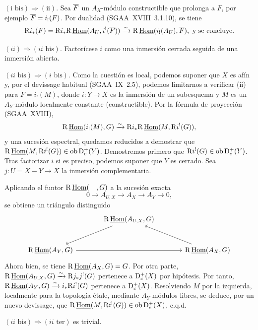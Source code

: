 $(\text{i~bis}) \Rightarrow (\text{ii})$. Sea $\overline{F}$ un $A_X$-módulo constructible que prolonga a $F$, por ejemplo $\overline{F} = i_{!}(F)$. Por dualidad (SGAA~XVIII~3.1.10), se tiene
\[
\mathrm{R} i_{*}(F) = \mathrm{R} i_{*} \mathrm{R}\,\underline{\operatorname{Hom}}(A_U, i^{!}(\overline{F})) \xrightarrow{\sim} \mathrm{R}\,\underline{\operatorname{Hom}}(i_{!}(A_U), \overline{F}), \text{ y se concluye.}
\]

$(ii) \Rightarrow (ii\text{~bis})$. Factorícese $i$ como una inmersión cerrada seguida de una inmersión abierta.

$(ii\text{~bis}) \Rightarrow (i\text{~bis})$. Como la cuestión es local, podemos suponer que $X$ es afín y, por el devissage habitual (SGAA~IX~2.5), podemos limitarnos a verificar (ii) para $F = i_{!}(M)$, donde $i : Y \to X$ es la inmersión de un subesquema y $M$ es un $A_Y$-módulo localmente constante (constructible). Por la fórmula de proyección (SGAA~XVIII),
\[
\mathrm{R}\,\underline{\operatorname{Hom}}(i_{!}(M), G) \xrightarrow{\sim} \mathrm{R} i_{*} \mathrm{R}\,\underline{\operatorname{Hom}}(M, \mathrm{R} i^{!}(G)),
\]
y una sucesión espectral, quedamos reducidos a demostrar que $\mathrm{R}\,\underline{\operatorname{Hom}}(M, \mathrm{R} i^{!}(G)) \in \operatorname{ob} \mathrm{D}_c^{+}(Y)$. Demostremos primero que $\mathrm{R} i^{!}(G) \in \operatorname{ob} \mathrm{D}_c^{+}(Y)$. Tras factorizar $i$ si es preciso, podemos suponer que $Y$ es cerrado. Sea $j : U = X - Y \to X$ la inmersión complementaria.

Aplicando el funtor $\mathrm{R}\,\underline{\operatorname{Hom}}(\quad, G)$ a la sucesión exacta
\[
0 \longrightarrow A_{U,X} \longrightarrow A_X \longrightarrow A_Y \longrightarrow 0,
\]
se obtiene un triángulo distinguido
\[
\begin{tikzcd}[column sep=large,row sep=large]
& \R\,\underline{\Hom}(A_{U,X}, G) \arrow[dl] & \\
\R\,\underline{\Hom}(A_Y, G) \arrow[rr] & & \R\,\underline{\Hom}(A_X, G) \arrow[ul]
\end{tikzcd}
\]
Ahora bien, se tiene $\mathrm{R}\,\underline{\operatorname{Hom}}(A_X, G) = G$. Por otra parte, $\mathrm{R}\,\underline{\operatorname{Hom}}(A_{U,X}, G) \xrightarrow{\sim} \mathrm{R} j_{*} j^{!}(G)$ pertenece a $\mathrm{D}_c^{+}(X)$ por hipótesis. Por tanto, $\mathrm{R}\,\underline{\operatorname{Hom}}(A_Y, G) \xrightarrow{\sim} i_{*} \mathrm{R} i^{!}(G)$ pertenece a $\mathrm{D}_c^{+}(X)$. Resolviendo $M$ por la izquierda, localmente para la topología étale, mediante $A_Y$-módulos libres, se deduce, por un nuevo devissage, que $\mathrm{R}\,\underline{\operatorname{Hom}}(M, \mathrm{R} i^{!}(G)) \in \operatorname{ob} \mathrm{D}_c^{+}(X)$, c.q.d.

$(ii\text{~bis}) \Rightarrow (ii\text{~ter})$ es trivial.


